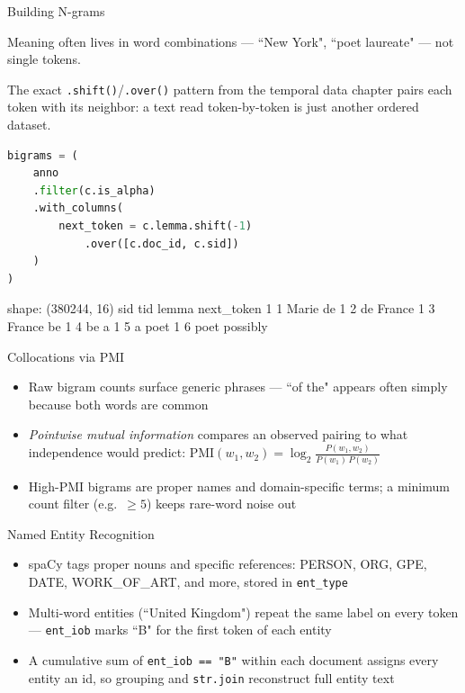 \documentclass[8pt,aspectratio=169]{beamer}
\begin{document}
\begin{frame}[fragile]{Building N-grams}
\begin{splitcode}{%

Meaning often lives in word combinations --- ``New York", ``poet laureate" --- not single tokens.

The exact \texttt{.shift()}/\texttt{.over()} pattern from the temporal data chapter pairs each token with its neighbor: a text read token-by-token is just another ordered dataset.

}
\begin{lstlisting}[language=Python]
bigrams = (
    anno
    .filter(c.is_alpha)
    .with_columns(
        next_token = c.lemma.shift(-1)
            .over([c.doc_id, c.sid])
    )
)
\end{lstlisting}
\begin{codeoutput}
shape: (380244, 16)
sid  tid  lemma   next_token
1    1    Marie   de
1    2    de      France
1    3    France  be
1    4    be      a
1    5    a       poet
1    6    poet    possibly
\end{codeoutput}
\end{splitcode}
\end{frame}

\begin{textframe}{Collocations via PMI}

\begin{itemize}
\item Raw bigram counts surface generic phrases --- ``of the" appears often simply because both words are common
\item \textit{Pointwise mutual information} compares an observed pairing to what independence would predict: $\text{PMI}(w_1, w_2) = \log_2 \frac{P(w_1, w_2)}{P(w_1)\,P(w_2)}$
\item High-PMI bigrams are proper names and domain-specific terms; a minimum count filter (e.g.\ $\geq 5$) keeps rare-word noise out
\end{itemize}

\end{textframe}

\begin{textframe}{Named Entity Recognition}

\begin{itemize}
\item spaCy tags proper nouns and specific references: PERSON, ORG, GPE, DATE, WORK\_OF\_ART, and more, stored in \texttt{ent\_type}
\item Multi-word entities (``United Kingdom") repeat the same label on every token --- \texttt{ent\_iob} marks ``B" for the first token of each entity
\item A cumulative sum of \texttt{ent\_iob == "B"} within each document assigns every entity an id, so grouping and \texttt{str.join} reconstruct full entity text
\end{itemize}

\end{textframe}
\end{document}
